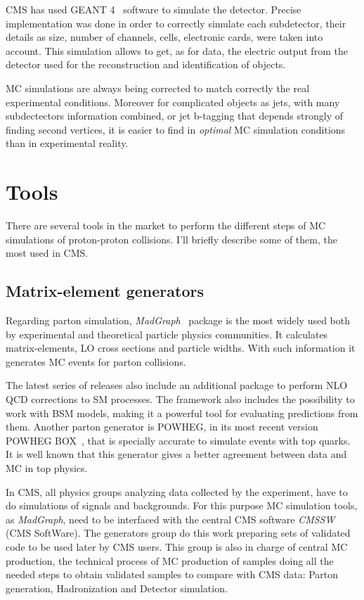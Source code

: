 CMS has used GEANT 4~\cite{Agostinelli:2002hh} software to simulate the detector. Precise implementation was done in order to correctly simulate each subdetector, their details as size, number of channels, cells, electronic cards, were taken into account. This simulation allows to get, as for data, the electric output from the detector used for the reconstruction and identification of objects. 

MC simulations are always being corrected to match correctly the real experimental conditions. Moreover for complicated objects as jets, with many subdectectors information combined, or jet b-tagging that depends strongly of finding second vertices, it is easier to find in \textit{optimal} MC simulation conditions than in experimental reality.

\section{Tools}
\label{sec:tools}

There are several tools in the market to perform the different steps of MC simulations of proton-proton collisions. I'll briefly describe some of them, the most used in CMS.

\subsection{Matrix-element generators}
\label{sec:ME}

Regarding parton simulation, \textit{MadGraph}~\cite{Alwall:2014hca, Alwall:2011uj} package is the most widely used both by experimental and theoretical particle physics communities. It calculates matrix-elements, LO cross sections and particle widths. With such information it generates MC events for parton collisions. 

The latest series of releases also include an additional package to perform NLO QCD corrections to SM processes. The framework also includes the possibility to work with BSM models, making it a powerful tool for evaluating predictions from them. Another parton generator is POWHEG, in its most recent version POWHEG BOX~\cite{Nason:2004rx, Frixione:2007vw, Alioli:2010xd}, that is specially accurate to simulate events with top quarks. It is well known that this generator gives a better agreement between data and MC in top physics.

In CMS, all physics groups analyzing data collected by the experiment, have to do simulations of signals and backgrounds. For this purpose MC simulation tools, as \textit{MadGraph}, need to be interfaced with the central CMS software \textit{CMSSW} (CMS SoftWare). The generators group do this work preparing sets of validated code to be used later by CMS users. This group is also in charge of central MC production, the technical process of MC production of samples doing all the needed steps to obtain validated samples to compare with CMS data: Parton generation, Hadronization and Detector simulation. 

